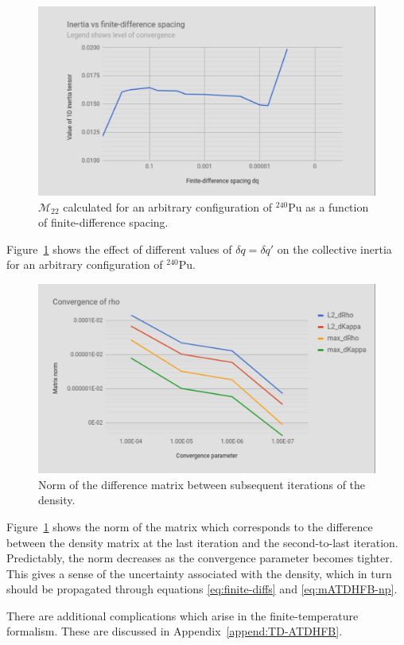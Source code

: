 \begin{figure}
	\centering
	\includegraphics[width=0.7\linewidth]{TeX_files/Num-dq_spacing}
	\caption[Collective inertia as a function of finite-difference spacing]{$\mathcal{M}_{22}$ calculated for an arbitrary configuration of $^{240}$Pu as a function of finite-difference spacing.}
	\label{fig:num-dqspacing}
\end{figure}

Figure~\ref{fig:num-dqspacing} shows the effect of different values of $\delta q = \delta q'$ on the collective inertia for an arbitrary configuration of $^{240}$Pu.

\begin{figure}
	\centering
	\includegraphics[width=0.7\linewidth]{TeX_files/Num-rho_conv}
	\caption[Norm of the difference matrix between subsequent iterations of the density]{Norm of the difference matrix between subsequent iterations of the density.}
	\label{fig:num-rhoconv}
\end{figure}

Figure~\ref{fig:num-dqspacing} shows the norm of the matrix which corresponds to the difference between the density matrix at the last iteration and the second-to-last iteration. Predictably, the norm decreases as the convergence parameter becomes tighter. This gives a sense of the uncertainty associated with the density, which in turn should be propagated through equations \eqref{eq:finite-diffs} and \eqref{eq:mATDHFB-np}.

There are additional complications which arise in the finite-temperature formalism. These are discussed in Appendix~\ref{append:TD-ATDHFB}.


